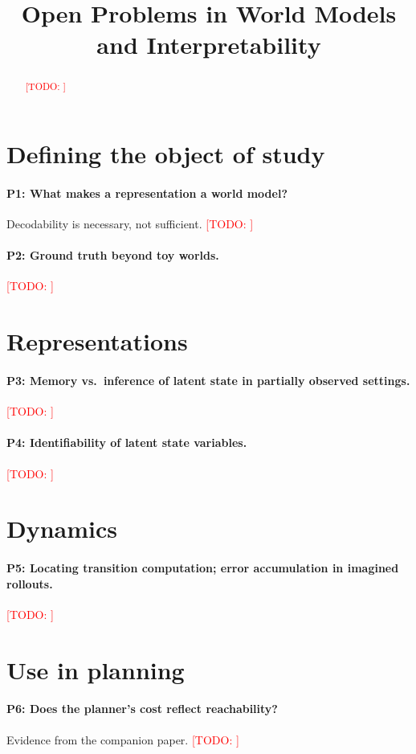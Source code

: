 \documentclass[11pt]{article}
\title{Open Problems in World Models and Interpretability}
\author{\todo{authors}}
\newcommand{\todo}[1]{\textcolor{red}{[TODO: #1]}}
\begin{document}
\maketitle

\begin{abstract}\todo{}\end{abstract}

\section{Defining the object of study}
\paragraph{P1: What makes a representation a world model?} Decodability is necessary, not sufficient. \todo{}
\paragraph{P2: Ground truth beyond toy worlds.} \todo{}

\section{Representations}
\paragraph{P3: Memory vs.\ inference of latent state in partially observed settings.} \todo{}
\paragraph{P4: Identifiability of latent state variables.} \todo{}

\section{Dynamics}
\paragraph{P5: Locating transition computation; error accumulation in imagined rollouts.} \todo{}

\section{Use in planning}
\paragraph{P6: Does the planner's cost reflect reachability?} Evidence from the companion paper. \todo{}
\end{document}
